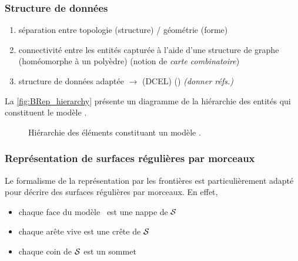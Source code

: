 \subsubsection{Structure de données}
\begin{enumerate}
	\item séparation entre topologie (structure) / géométrie (forme)
	\item connectivité entre les entités capturée à l'aide d'une structure de graphe (homéomorphe à un polyèdre) (notion de \textit{carte combinatoire})
	\item structure de données adaptée $\to$  (DCEL) () \textit{(donner réfs.)}
\end{enumerate}

La \autoref{fig:BRep_hierarchy} présente un diagramme de la hiérarchie des entités qui constituent le modèle \brep.
\begin{figure}
	\centering
	
	\caption{Hiérarchie des éléments constituant un modèle \brep.}
	\label{fig:BRep_hierarchy}
\end{figure}


\subsubsection{Représentation de surfaces régulières par morceaux}
Le formalisme de la représentation par les frontières est particulièrement adapté pour décrire des surfaces régulières par morceaux. 
En effet, 
\begin{itemize}
	\item chaque face du modèle \brep\ est une nappe de $\mathcal{S}$
	\item chaque arête vive est une crête de $\mathcal{S}$
	\item chaque coin de $\mathcal{S}$ est un sommet \brep
\end{itemize}











